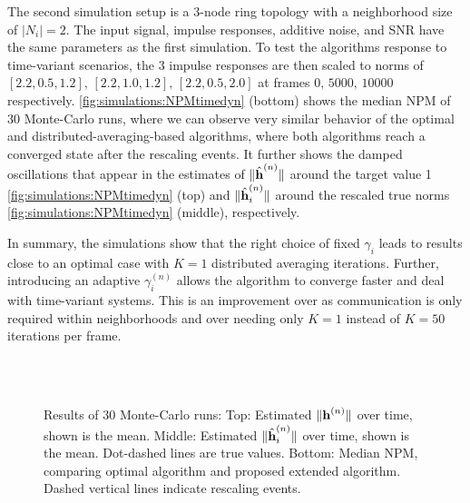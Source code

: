 \documentclass{article}
\begin{document}
The second simulation setup is a \(3\)-node ring topology with a neighborhood size of \(|N_i|=2\).
The input signal, impulse responses, additive noise, and SNR have the same parameters as the first simulation.
To test the algorithms response to time-variant scenarios, the 3 impulse responses are then scaled to norms of \([2.2, 0.5, 1.2],\, [2.2, 1.0, 1.2],\, [2.2, 0.5, 2.0]\) at frames \(0,\, 5000,\, 10000\) respectively.
\autoref{fig:simulations:NPMtimedyn} (bottom) shows the median NPM of 30 Monte-Carlo runs, where we can observe very similar behavior of the optimal and distributed-averaging-based algorithms, where both algorithms reach a converged state after the rescaling events.
It further shows the damped oscillations that appear in the estimates of \(\|\hat{\bm{\mathrm{h}}}^{(n)}\|\) around the target value 1 \autoref{fig:simulations:NPMtimedyn} (top) and \(\|\hat{\bm{\mathrm{h}}}_i^{(n)}\|\) around the rescaled true norms \autoref{fig:simulations:NPMtimedyn} (middle), respectively.

In summary, the simulations show that the right choice of fixed \(\gamma_i\) leads to results close to an optimal case with \(K=1\) distributed averaging iterations.
Further, introducing an adaptive \(\gamma_i^{(n)}\) allows the algorithm to converge faster and deal with time-variant systems.
This is an improvement over \cite{blochbergerDBSI} as communication is only required within neighborhoods and over \cite{liuDistributedBlindIdentification2016,liuDistributedRecursiveBlind2017} needing only \(K=1\) instead of \(K=50\) iterations per frame.

\begin{figure}[t]
    \centering
    \\\vspace*{-1.0cm}
    \\\vspace*{-1.0cm}
    
    \vspace*{-0.6cm}
    \caption[]{Results of 30 Monte-Carlo runs: Top: Estimated \(\|\bm{\mathrm{h}}^{(n)}\|\) over time, shown is the mean. Middle: Estimated \(\|\hat{\bm{\mathrm{h}}}_i^{(n)}\|\) over time, shown is the mean. Dot-dashed lines are true values. Bottom: Median NPM, comparing optimal algorithm and proposed extended algorithm. Dashed vertical lines indicate rescaling events.}
    \label{fig:simulations:NPMtimedyn}
\end{figure}
\end{document}
